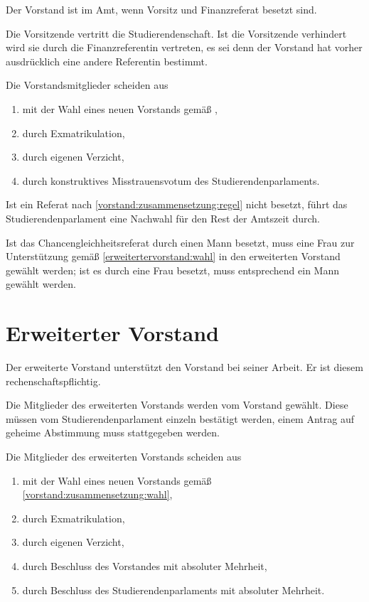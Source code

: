 \begin{contract}
Der Vorstand ist im Amt, wenn Vorsitz und Finanzreferat besetzt sind.

Die Vorsitzende vertritt die Studierendenschaft. Ist die Vorsitzende  verhindert wird sie durch die Finanzreferentin vertreten, es sei denn der Vorstand hat vorher ausdrücklich eine andere Referentin bestimmt.

Die Vorstandsmitglieder scheiden aus
  \begin{enumerate}
  \item mit der Wahl eines neuen Vorstands gemäß ,
  \item durch Exmatrikulation,
  \item durch eigenen Verzicht,
  \item durch konstruktives Misstrauensvotum des Studierendenparlaments.
  \end{enumerate}
    Ist ein Referat nach \ref{vorstand:zusammensetzung:regel} nicht besetzt, führt das Studierendenparlament eine Nachwahl für den Rest der Amtszeit durch.

Ist das Chancengleichheitsreferat durch einen Mann besetzt, muss eine Frau zur Unterstützung gemäß \ref{erweitertervorstand:wahl} in den erweiterten Vorstand gewählt werden; ist es durch eine Frau besetzt, muss entsprechend ein Mann gewählt werden.


%
%

\parnumberfalse \section{Erweiterter Vorstand} \parnumbertrue

\label{erweitertervorstand:aufgaben}
\parnumberfalse Der erweiterte Vorstand unterstützt den Vorstand bei seiner Arbeit. Er ist diesem rechenschaftspflichtig.\parnumbertrue

 \label{erweitertervorstand:wahl}

Die Mitglieder des erweiterten Vorstands werden vom Vorstand gewählt. Diese müssen vom Studierendenparlament einzeln bestätigt werden, einem Antrag auf geheime Abstimmung muss stattgegeben werden.

Die Mitglieder des erweiterten Vorstands scheiden aus
\begin{enumerate}
  \item mit der Wahl eines neuen Vorstands gemäß \ref{vorstand:zusammensetzung:wahl},
  \item durch Exmatrikulation,
  \item durch eigenen Verzicht,
  \item durch Beschluss des Vorstandes mit absoluter Mehrheit,
  \item durch Beschluss des Studierendenparlaments mit absoluter Mehrheit.
\end{enumerate}



\end{contract}
